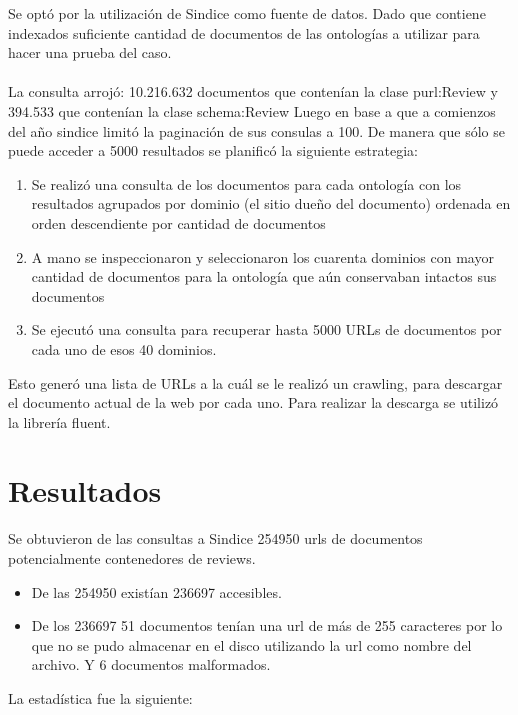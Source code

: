 Se optó por la utilización de Sindice como fuente de datos. Dado que contiene indexados suficiente cantidad de documentos de las 
ontologías a utilizar para hacer una prueba del caso.
\\\\
La consulta arrojó: 10.216.632 documentos que contenían la clase purl:Review y 394.533 que contenían la clase schema:Review
Luego en base a que a comienzos del año sindice limitó la paginación de sus consulas a 100. De manera que sólo se puede acceder a 5000 
resultados se planificó la siguiente estrategia:
\begin{enumerate}
 \item Se realizó una consulta de los documentos para cada ontología con los resultados agrupados por dominio (el sitio dueño del documento) ordenada en orden descendiente por cantidad de documentos 
 \item A mano se inspeccionaron y seleccionaron los cuarenta dominios con mayor cantidad de documentos para la ontología que aún conservaban intactos sus documentos
 \item Se ejecutó una consulta para recuperar hasta 5000 URLs de documentos por cada uno de esos 40 dominios.
\end{enumerate}

\noindent Esto generó una lista de URLs a la cuál se le realizó un crawling, para descargar el documento actual de la web por cada uno. Para realizar la descarga se utilizó la librería fluent.

\section{Resultados}
\label{section:recoleccion-resultados}

\noindent Se obtuvieron de las consultas a Sindice 254950 urls de documentos potencialmente contenedores de reviews.
\begin{itemize}
 \item De las 254950 existían 236697 accesibles.
 \item De los 236697 51 documentos tenían una url de más de 255 caracteres por lo que no se pudo almacenar en el disco utilizando la url como nombre del archivo. Y 6 documentos malformados.
\end{itemize}

\noindent La estadística fue la siguiente:

